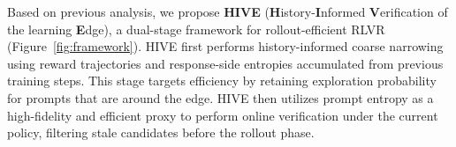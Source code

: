 


Based on previous analysis, we propose \textbf{HIVE} (\textbf{H}istory-\textbf{I}nformed \textbf{V}erification of the learning \textbf{E}dge), a dual-stage 
framework for rollout-efficient RLVR (Figure~\ref{fig:framework}). HIVE first performs history-informed coarse narrowing using 
reward trajectories and response-side entropies accumulated from previous training steps. This stage targets efficiency by retaining exploration probability for prompts that are around the edge. HIVE then utilizes prompt entropy as a high-fidelity and efficient proxy to perform online verification under the current policy, filtering stale candidates before the rollout phase.

